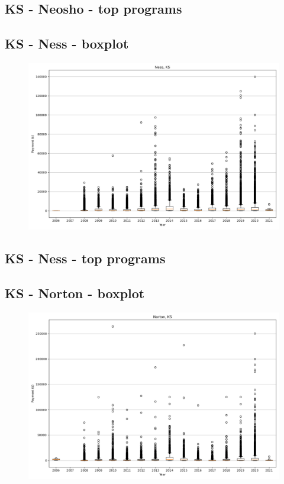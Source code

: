 \subsection*{KS - Neosho - top programs}

\newpage
\subsection*{KS - Ness - boxplot}
\begin{figure}[h]
\centering
\includegraphics[width=7in]{../output/boxplots/counties/Ness-KS_boxplot.png}
\end{figure}


\subsection*{KS - Ness - top programs}

\newpage
\subsection*{KS - Norton - boxplot}
\begin{figure}[h]
\centering
\includegraphics[width=7in]{../output/boxplots/counties/Norton-KS_boxplot.png}
\end{figure}



